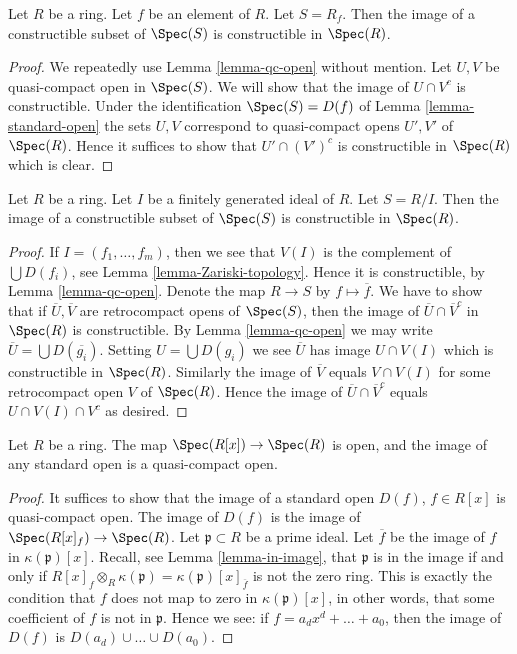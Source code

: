 \begin{lemma}
\label{lemma-open-fp}
Let $R$ be a ring.
Let $f$ be an element of $R$.
Let $S = R_f$.
Then the image of a constructible subset of $\Spec(S)$
is constructible in $\Spec(R)$.
\end{lemma}

\begin{proof}
We repeatedly use Lemma \ref{lemma-qc-open} without mention.
Let $U, V$ be quasi-compact open in $\Spec(S)$.
We will show that the image of $U \cap V^c$ is constructible.
Under the identification
$\Spec(S) = D(f)$ of Lemma \ref{lemma-standard-open}
the sets $U, V$ correspond to quasi-compact opens
$U', V'$ of $\Spec(R)$.
Hence it suffices to show that $U' \cap (V')^c$
is constructible in $\Spec(R)$ which is clear.
\end{proof}

\begin{lemma}
\label{lemma-closed-fp}
Let $R$ be a ring.
Let $I$ be a finitely generated ideal of $R$.
Let $S = R/I$.
Then the image of a constructible subset of $\Spec(S)$
is constructible in $\Spec(R)$.
\end{lemma}

\begin{proof}
If $I = (f_1, \ldots, f_m)$, then we see that
$V(I)$ is the complement of $\bigcup D(f_i)$,
see Lemma \ref{lemma-Zariski-topology}.
Hence it is constructible, by Lemma \ref{lemma-qc-open}.
Denote the map $R \to S$ by $f \mapsto \overline{f}$.
We have to show that if $\overline{U}, \overline{V}$
are retrocompact opens of $\Spec(S)$, then the
image of $\overline{U} \cap \overline{V}^c$
in $\Spec(R)$ is constructible.
By Lemma \ref{lemma-qc-open} we may write
$\overline{U} = \bigcup D(\overline{g_i})$.
Setting $U = \bigcup D({g_i})$ we see $\overline{U}$
has image $U \cap V(I)$ which is constructible in
$\Spec(R)$. Similarly the image of $\overline{V}$ equals
$V \cap V(I)$ for some retrocompact open $V$ of $\Spec(R)$.
Hence the image of $\overline{U} \cap \overline{V}^c$
equals $U \cap V(I) \cap V^c$ as desired.
\end{proof}

\begin{lemma}
\label{lemma-affineline-open}
Let $R$ be a ring. The map $\Spec(R[x]) \to \Spec(R)$
is open, and the image of any standard open is a quasi-compact
open.
\end{lemma}

\begin{proof}
It suffices to show that the image of a standard open
$D(f)$, $f\in R[x]$ is quasi-compact open.
The image of $D(f)$ is the image of
$\Spec(R[x]_f) \to \Spec(R)$.
Let $\mathfrak p \subset R$ be a prime ideal.
Let $\overline{f}$ be the image of $f$ in
$\kappa(\mathfrak p)[x]$.
Recall, see Lemma \ref{lemma-in-image},
that $\mathfrak p$ is in the image
if and only if $R[x]_f \otimes_R \kappa(\mathfrak p) =
\kappa(\mathfrak p)[x]_{\overline{f}}$ is not the
zero ring. This is exactly the condition that $f$ does not map
to zero in $\kappa(\mathfrak p)[x]$, in other words, that
some coefficient of $f$ is not in $\mathfrak p$.
Hence we see: if $f = a_d x^d + \ldots + a_0$, then
the image of $D(f)$ is $D(a_d) \cup \ldots \cup D(a_0)$.
\end{proof}

